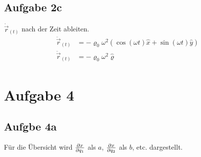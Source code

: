 \documentclass[a4paper,10pt]{extarticle}
\begin{document}
\subsection*{Aufgabe 2c}
$\dot{\vec{r}}_{(t)}$ nach der Zeit ableiten.
\begin{align*}
\ddot{\vec{r}}_{(t)} &= - \varrho_0 \omega^2 (\cos(\omega t )\hat{x} + \sin(\omega t ) \hat{y}) \\
\ddot{\vec{r}}_{(t)} &= - \varrho_0 \omega^2 \hat{\varrho} \\
\end{align*}


\section*{Aufgabe 4}
  \subsection*{Aufgbe 4a}
  Für die Übersicht wird $\pdv{x}{q_1}$ als $a$, $\pdv{x}{q_2}$ als $b$, etc. dargestellt.
\end{document}
